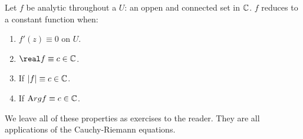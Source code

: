 \documentclass[notes]{subfile}
\begin{document}
Let $f$ be analytic throughout a  $U$: an oppen and connected set in $\operatorname{\mathbb{C}}$.
$f$ reduces to a constant function when:
\begin{enumerate}

\item $f'(z) \equiv 0$ on $U$.

\item $\real f \equiv c \in \C$.

\item If $|f| \equiv c \in \operatorname{\mathbb{C}}$.

\item If ${\text Arg} f \equiv c \in \operatorname{\mathbb{C}}$.

\end{enumerate}

\noindent
We leave all of these properties as exercises to the reader.
They are all applications of the Cauchy-Riemann equations.
\end{document}
